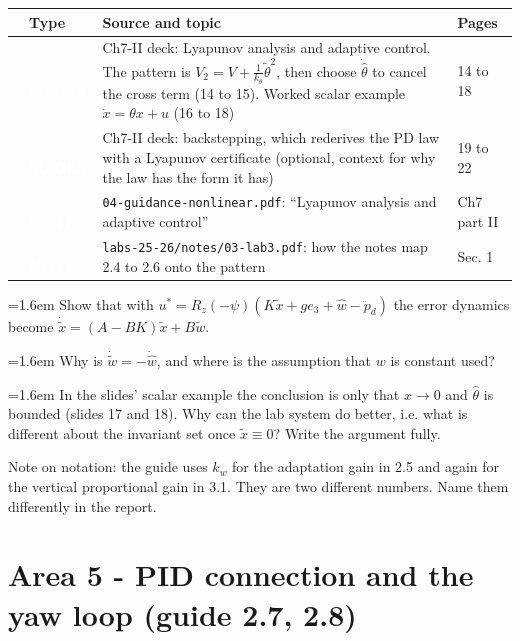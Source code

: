 \documentclass[10pt,a4paper]{article}
\newcommand{\cb}{\raisebox{-0.35ex}{\Large$\square$}}
\newcommand{\srctag}[2]{\colorbox{#1}{\textcolor{white}{\textbf{\scriptsize\,#2\,}}}}
\newcommand{\SLIDES}{\srctag{slides}{SLIDES}}
\newcommand{\NOTES}{\srctag{notes}{NOTES}}
\newcommand{\chk}[1]{\par\noindent\hangindent=1.6em\hangafter=1 \cb\hspace{0.6em}#1}
\begin{document}
\begin{tabularx}{\textwidth}{@{}C T X l@{}}
\toprule
\cb & Type & Source and topic & Pages\\
\midrule
\cb & \SLIDES & Ch7-II deck: Lyapunov analysis and adaptive control. The pattern is $V_2=V+\tfrac{1}{k_\theta}\tilde\theta^2$, then choose $\dot{\hat\theta}$ to cancel the cross term (14 to 15). Worked scalar example $\dot x=\theta x+u$ (16 to 18) & 14 to 18\\
\cb & \SLIDES & Ch7-II deck: backstepping, which rederives the PD law with a Lyapunov certificate (optional, context for why the law has the form it has) & 19 to 22\\
\cb & \NOTES & \texttt{04-guidance-nonlinear.pdf}: ``Lyapunov analysis and adaptive control'' & Ch7 part II\\
\cb & \NOTES & \texttt{labs-25-26/notes/03-lab3.pdf}: how the notes map 2.4 to 2.6 onto the pattern & Sec. 1\\
\bottomrule
\end{tabularx}
\begin{selfcheck}
\chk{Show that with $u^*=R_z(-\psi)(K\tilde x+ge_3+\hat w-\ddot p_d)$ the error dynamics become $\dot{\tilde x}=(A-BK)\tilde x+B\tilde w$.}
\chk{Why is $\dot{\tilde w}=-\dot{\hat w}$, and where is the assumption that $w$ is constant used?}
\chk{In the slides' scalar example the conclusion is only that $x\to 0$ and $\hat\theta$ is bounded (slides 17 and 18). Why can the lab system do better, i.e. what is different about the invariant set once $\tilde x\equiv 0$? Write the argument fully.}
\end{selfcheck}
Note on notation: the guide uses $k_w$ for the adaptation gain in 2.5 and again for the vertical proportional gain in 3.1.
They are two different numbers.
Name them differently in the report.

\section*{Area 5 - PID connection and the yaw loop \hfill\normalfont\small (guide 2.7, 2.8)}
\end{document}
